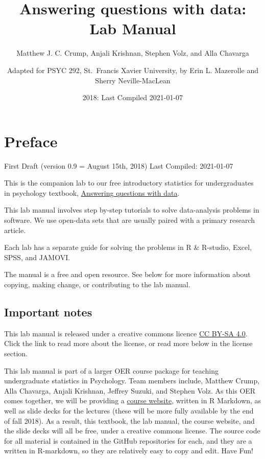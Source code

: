 \documentclass[]{book}
\title{Answering questions with data: Lab Manual}
\author{Matthew J. C. Crump, Anjali Krishnan, Stephen Volz, and Alla Chavarga \and Adapted for PSYC 292, St.~Francis Xavier University, by Erin L.
Mazerolle and Sherry Neville-MacLean}
\date{2018: Last Compiled 2021-01-07}
\begin{document}
\maketitle

{
\setcounter{tocdepth}{1}
\tableofcontents
}
\chapter*{Preface}\label{preface}

First Draft (version 0.9 = August 15th, 2018) Last Compiled: 2021-01-07

This is the companion lab to our free introductory statistics for
undergraduates in psychology textbook,
\href{https://crumplab.github.io/statistics/}{Answering questions with
data}.

This lab manual involves step by-step tutorials to solve data-analysis
problems in software. We use open-data sets that are usually paired with
a primary research article.

Each lab has a separate guide for solving the problems in R \& R-studio,
Excel, SPSS, and JAMOVI.

The manual is a free and open resource. See below for more information
about copying, making change, or contributing to the lab manual.

\section{Important notes}\label{important-notes}

This lab manual is released under a creative commons licence
\href{https://creativecommons.org/licenses/by-sa/4.0/}{CC BY-SA 4.0}.
Click the link to read more about the license, or read more below in the
license section.

This lab manual is part of a larger OER course package for teaching
undergraduate statistics in Psychology. Team members include, Matthew
Crump, Alla Chavarga, Anjali Krishnan, Jeffrey Suzuki, and Stephen Volz.
As this OER comes together, we will be providing a
\href{https://crumplab.github.io/psyc3400/}{course website}, written in
R Markdown, as well as slide decks for the lectures (these will be more
fully available by the end of fall 2018). As a result, this textbook,
the lab manual, the course website, and the slide decks will all be
free, under a creative commons license. The source code for all material
is contained in the GitHub repositories for each, and they are a written
in R-markdown, so they are relatively easy to copy and edit. Have Fun!
\end{document}
